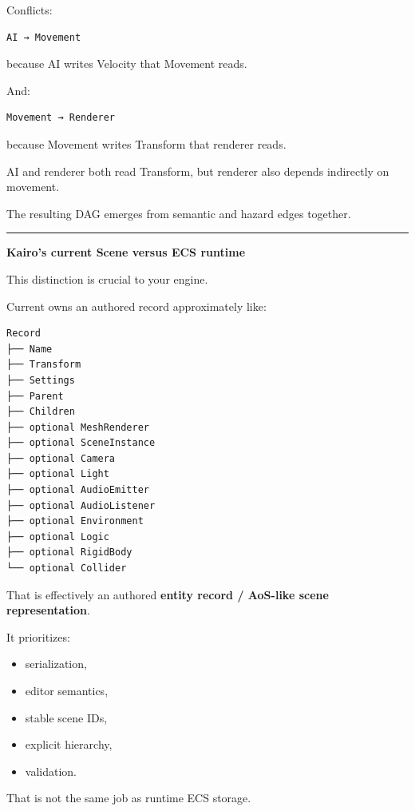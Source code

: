 Conflicts:

\begin{verbatim}
AI → Movement
\end{verbatim}

because AI writes Velocity that Movement reads.

And:

\begin{verbatim}
Movement → Renderer
\end{verbatim}

because Movement writes Transform that renderer reads.

AI and renderer both read Transform, but renderer also depends indirectly on movement.

The resulting DAG emerges from semantic and hazard edges together.

\begin{center}\rule{0.5\linewidth}{0.5pt}\end{center}

\textbf{Kairo's current Scene versus ECS runtime}

This distinction is crucial to your engine.

Current  owns an authored record approximately like:

\begin{verbatim}
Record
├── Name
├── Transform
├── Settings
├── Parent
├── Children
├── optional MeshRenderer
├── optional SceneInstance
├── optional Camera
├── optional Light
├── optional AudioEmitter
├── optional AudioListener
├── optional Environment
├── optional Logic
├── optional RigidBody
└── optional Collider
\end{verbatim}

That is effectively an authored \textbf{entity record / AoS-like scene representation}.

It prioritizes:

\begin{itemize}
\tightlist
\item
  serialization,
\item
  editor semantics,
\item
  stable scene IDs,
\item
  explicit hierarchy,
\item
  validation.
\end{itemize}

That is not the same job as runtime ECS storage.

